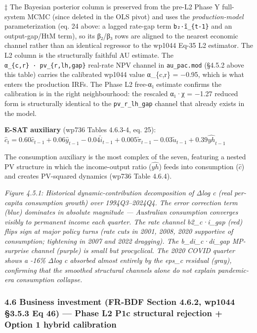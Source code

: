 \documentclass[
]{article}
\begin{document}
‡ The Bayesian posterior column is preserved from the pre-L2 Phase Y
full-system MCMC (since deleted in the OLS pivot) and uses the
\emph{production-model} parameterization (eq. 24 above: a lagged
rate-gap term \texttt{b₂·ĩ\_\{t-1\}} and an output-gap/HtM term), so its
β₂/β₃ rows are aligned to the nearest economic channel rather than an
identical regressor to the wp1044 Eq-35 L2 estimator. The L2 column is
the structurally faithful AU estimate. The
\texttt{α\_\{c,r\}\ ·\ pv\_\{r,lh,gap\}} real-rate NPV channel in
\texttt{au\_pac.mod} (§4.5.2 above this table) carries the calibrated
wp1044 value α\_\{c,r\} = −0.95, which is what enters the production
IRFs. The Phase L2 free-α₁ estimate confirms the calibration is in the
right neighbourhood: the rescaled α₁·χ = −1.27 reduced form is
structurally identical to the \texttt{pv\_r\_lh\_gap} channel that
already exists in the model.

\textbf{E-SAT auxiliary} (wp736 Tables 4.6.3-4, eq. 25):
\(\hat{c}_t = 0.60 \hat{c}_{t-1} + 0.06 \hat{y}_{t-1} - 0.04 \tilde{i}_{t-1} + 0.005 \tilde{\pi}_{t-1} - 0.03 \tilde{u}_{t-1} + 0.39 \widehat{yh}_{t-1}\)

The consumption auxiliary is the most complex of the seven, featuring a
nested PV structure in which the income-output ratio (\(\widehat{yh}\))
feeds into consumption (\(\hat{c}\)) and creates PV-squared dynamics
(wp736 Table 4.6.4).

\emph{Figure 4.5.1: Historical dynamic-contribution decomposition of
Δlog c (real per-capita consumption growth) over 1994Q3--2024Q4. The
error correction term (blue) dominates in absolute magnitude ---
Australian consumption converges visibly to permanent income each
quarter. The rate channel b2\_c·i\_gap (red) flips sign at major policy
turns (rate cuts in 2001, 2008, 2020 supportive of consumption;
tightening in 2007 and 2022 dragging). The b\_di\_c·di\_gap MP-surprise
channel (purple) is small but procyclical. The 2020 COVID quarter shows
a -16\% Δlog c absorbed almost entirely by the eps\_c residual (gray),
confirming that the smoothed structural channels alone do not explain
pandemic-era consumption collapse.}

\subsubsection{4.6 Business investment (FR-BDF Section 4.6.2, wp1044
§3.5.3 Eq 46) --- Phase L2 P1c structural rejection + Option 1 hybrid
calibration}\label{business-investment-fr-bdf-section-4.6.2-wp1044-3.5.3-eq-46-phase-l2-p1c-structural-rejection-option-1-hybrid-calibration}
\end{document}
